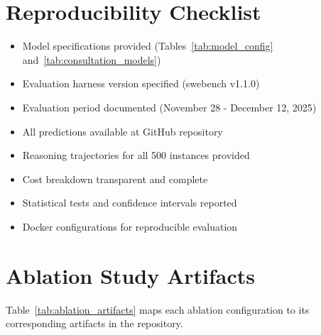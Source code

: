 \documentclass[11pt,a4paper]{article}
\begin{document}
\section{Reproducibility Checklist}

\begin{itemize}
    \item[$\checkmark$] Model specifications provided (Tables~\ref{tab:model_config} and~\ref{tab:consultation_models})
    \item[$\checkmark$] Evaluation harness version specified (swebench v1.1.0)
    \item[$\checkmark$] Evaluation period documented (November 28 - December 12, 2025)
    \item[$\checkmark$] All predictions available at GitHub repository
    \item[$\checkmark$] Reasoning trajectories for all 500 instances provided
    \item[$\checkmark$] Cost breakdown transparent and complete
    \item[$\checkmark$] Statistical tests and confidence intervals reported
    \item[$\checkmark$] Docker configurations for reproducible evaluation
\end{itemize}

\section{Ablation Study Artifacts}

Table~\ref{tab:ablation_artifacts} maps each ablation configuration to its corresponding artifacts in the repository.
\end{document}
